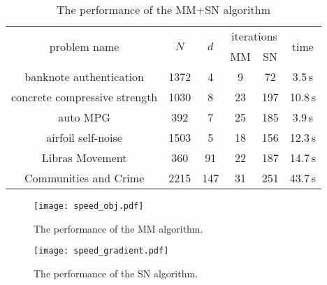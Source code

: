 \documentclass{siamart}
\newcommand{\epc}{\hspace{1pc}}
\begin{document}
\begin{table}[H]
\centering
\begin{footnotesize}
\begin{tabular}{|c | c c| c  c| c |}
\hline
	
\multirow{2}{*}{ problem name } & \multirow{2}{*}{$N$} & \multirow{2}{*}{$d$} & \multicolumn{2}{|c|}{iterations} & \multirow{2}{*}{time} \\
\cline{4-5}
 & & &  MM & SN & \\\hline


banknote authentication
     &1372  &  4     & 9     &   72   & 3.5\,s\\[2pt]
 \hline
concrete compressive  strength
     &1030  &  8    & 23    &   197  & 10.8\,s\\[2pt]
 \hline
auto MPG
     &392  &  7     & 25    &    185  & 3.9\,s \\[2pt]
 \hline
 airfoil self-noise & 1503  &  5     & 18    &  156    & 12.3\,s \\[2pt]
 \hline
  Libras Movement  & 360 &  91     & 22    &    187  & 14.7\,s \\[2pt]
 \hline
 Communities and Crime & 2215 &  147    & 31    &    251  & 43.7\,s \\[2pt]
 \hline
\end{tabular}
\end{footnotesize}
 \caption{\small The performance of the MM+SN algorithm} \label{table1}
 \end{table}


\begin{figure}[H]
\begin{center}
\begin{minipage}{.47\textwidth}
\centering
\texttt{[image: speed\_obj.pdf]}
\caption{\scriptsize{The performance of the MM algorithm.}}
\label{figure: MM speed}
\end{minipage}
\epc
\begin{minipage}{.45\textwidth}
\centering
\texttt{[image: speed\_gradient.pdf]}
\caption{\scriptsize{The performance of the SN algorithm.}}
\label{figure: Newton speed}
\end{minipage}
\end{center}
\end{figure}
\end{document}
